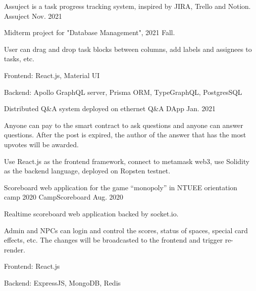 

\begin{cventries}

  \cventry
  {Assuject is a task progress tracking system, inspired by JIRA, Trello and Notion.}
  {Assuject \href{https://github.com/MortalHappiness/DBM2021FallMidtermProject}{\color{red}{[Github Link]}}}
  {}
  {Nov. 2021} %
  {
    \begin{cvitems} %
      \item {Midterm project for "Database Management", 2021 Fall.}
      \item {User can drag and drop task blocks between columns, add labels and assignees to tasks, etc.}
      \item {Frontend: React.js, Material UI}
      \item {Backend: Apollo GraphQL server, Prisma ORM, TypeGraphQL, PostgresSQL}
    \end{cvitems}
  }

  \cventry
  {Distributed Q\&A system deployed on ethernet}
  {Q\&A DApp \href{https://github.com/MortalHappiness/NMLab2020Fall-Final}{\color{red}{[Github Link]}}}
  {}
  {Jan. 2021} %
  {
    \begin{cvitems} %
      \item {Anyone can pay to the smart contract to ask questions and anyone can answer questions. After the post is expired, the author of the answer that has the most upvotes will be awarded.}
      \item {Use React.js as the frontend framework, connect to metamask web3, use Solidity as the backend language, deployed on Ropsten testnet.}
    \end{cvitems}
  }

  \cventry
  {Scoreboard web application for the game “monopoly” in NTUEE orientation camp 2020}
  {CampScoreboard \href{https://github.com/MortalHappiness/CampScoreboard}{\color{red}{[Github Link]}}}
  {}
  {Aug. 2020} %
  {
    \begin{cvitems} %
      \item {Realtime scoreboard web application backed by socket.io.}
      \item {Admin and NPCs can login and control the scores, status of spaces, special card effects, etc. The changes will be broadcasted to the frontend and trigger re-render.}
      \item {Frontend: React.js}
      \item {Backend: ExpressJS, MongoDB, Redis}
    \end{cvitems}
  }


\end{cventries}
